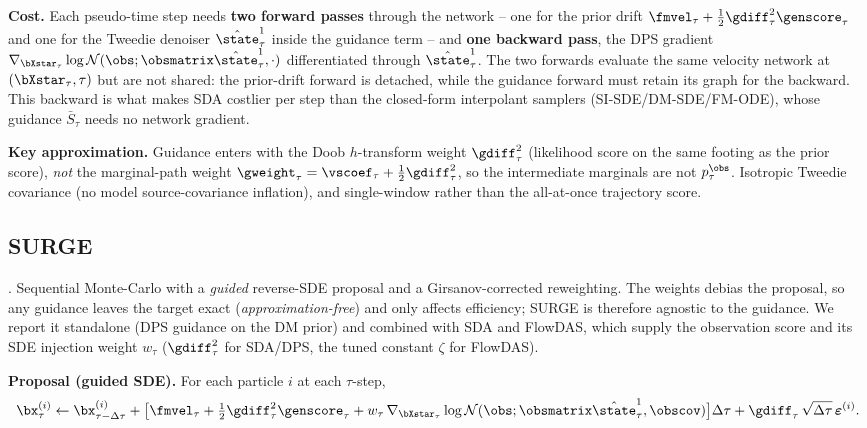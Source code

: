 \textbf{Cost.}
Each pseudo-time step needs \textbf{two forward passes} through the network -- one for the prior drift $\fmvel_\tau+\tfrac12\gdiff_\tau^2\genscore_\tau$ and one for the Tweedie denoiser $\hat{\state}^1_\tau$ inside the guidance term -- and \textbf{one backward pass}, the DPS gradient $\nabla_{\bXstar_\tau}\log\mathcal{N}(\obs;\obsmatrix\hat{\state}^1_\tau,\cdot)$ differentiated through $\hat{\state}^1_\tau$. The two forwards evaluate the same velocity network at $(\bXstar_\tau,\tau)$ but are not shared: the prior-drift forward is detached, while the guidance forward must retain its graph for the backward. This backward is what makes SDA costlier per step than the closed-form interpolant samplers (SI-SDE/DM-SDE/FM-ODE), whose guidance $\bar S_\tau$ needs no network gradient.

\textbf{Key approximation.}
Guidance enters with the Doob $h$-transform weight $\gdiff_\tau^2$ (likelihood score on the same footing as the prior score), \emph{not} the marginal-path weight $\gweight_\tau=\vscoef_\tau+\tfrac12\gdiff_\tau^2$, so the intermediate marginals are not $p_\tau^{\obs}$. Isotropic Tweedie covariance (no model source-covariance inflation), and single-window rather than the all-at-once trajectory score.

\subsection{SURGE}\label{appendix:method:surge}

\cite{wei_surge_2026}. Sequential Monte-Carlo with a \emph{guided} reverse-SDE proposal and a Girsanov-corrected reweighting. The weights debias the proposal, so any guidance leaves the target exact (\emph{approximation-free}) and only affects efficiency; SURGE is therefore agnostic to the guidance. We report it standalone (DPS guidance on the DM prior) and combined with SDA and FlowDAS, which supply the observation score and its SDE injection weight $w_\tau$ ($\gdiff_\tau^2$ for SDA/DPS, the tuned constant $\zeta$ for FlowDAS).

\textbf{Proposal (guided SDE).}
For each particle $i$ at each $\tau$-step,
\begin{align}
  \bx_\tau^{(i)} \leftarrow \bx_{\tau-\Delta\tau}^{(i)}
  + \bigl[\fmvel_\tau+\tfrac12\gdiff_\tau^2\genscore_\tau
     + w_\tau\,\nabla_{\bXstar_\tau}\log\mathcal{N}(\obs;\obsmatrix\hat{\state}^1_\tau,\obscov)\bigr]\Delta\tau
  + \gdiff_\tau\,\sqrt{\Delta\tau}\,\boldsymbol\varepsilon^{(i)}.
\end{align}

